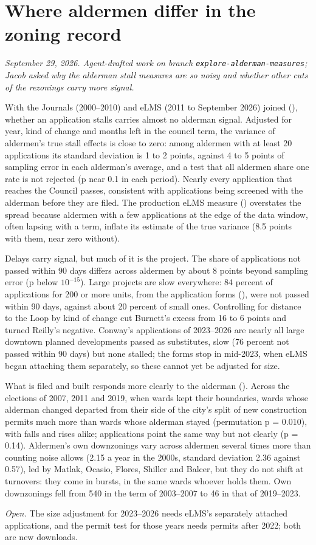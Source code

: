 \clearpage
\section*{Where aldermen differ in the zoning record}
\textit{September 29, 2026. Agent-drafted work on branch \texttt{explore-alderman-measures}; Jacob asked why the
alderman stall measures are so noisy and whether other cuts of the rezonings carry more signal.}

With the Journals (2000--2010) and eLMS (2011 to September 2026) joined
(), whether an application stalls carries almost no alderman signal.
Adjusted for year, kind of change and months left in the council term, the variance of aldermen's true stall effects
is close to zero: among aldermen with at least 20 applications its standard deviation is 1 to 2 points, against 4 to 5
points of sampling error in each alderman's average, and a test that all aldermen share one rate is not rejected (p
near 0.1 in each period). Nearly every application that reaches the Council passes, consistent with applications
being screened with the alderman before they are filed. The production eLMS measure
() overstates the spread because aldermen with a few applications at the
edge of the data window, often lapsing with a term, inflate its estimate of the true variance (8.5 points with them,
near zero without).

Delays carry signal, but much of it is the project. The share of applications not passed within 90 days differs
across aldermen by about 8 points beyond sampling error (p below $10^{-15}$). Large projects are slow everywhere: 84
percent of applications for 200 or more units, from the application forms
(), were not passed within 90 days, against about 20 percent of small
ones. Controlling for distance to the Loop by kind of change cut Burnett's excess from 16 to 6 points and turned
Reilly's negative. Conway's applications of 2023--2026 are nearly all large downtown planned developments passed as
substitutes, slow (76 percent not passed within 90 days) but none stalled; the forms stop in mid-2023, when eLMS began
attaching them separately, so these cannot yet be adjusted for size.

What is filed and built responds more clearly to the alderman
(). Across the elections of 2007, 2011 and 2019, when wards kept their
boundaries, wards whose alderman changed departed from their side of the city's split of new construction permits
much more than wards whose alderman stayed (permutation p = 0.010), with falls and rises alike; applications point
the same way but not clearly (p = 0.14). Aldermen's own downzonings vary across aldermen several times more than
counting noise allows (2.15 a year in the 2000s, standard deviation 2.36 against 0.57), led by Matlak, Ocasio, Flores,
Shiller and Balcer, but they do not shift at turnovers: they come in bursts, in the same wards whoever holds them. Own
downzonings fell from 540 in the term of 2003--2007 to 46 in that of 2019--2023.

\textit{Open.} The size adjustment for 2023--2026 needs eLMS's separately attached applications, and the permit test
for those years needs permits after 2022; both are new downloads.
